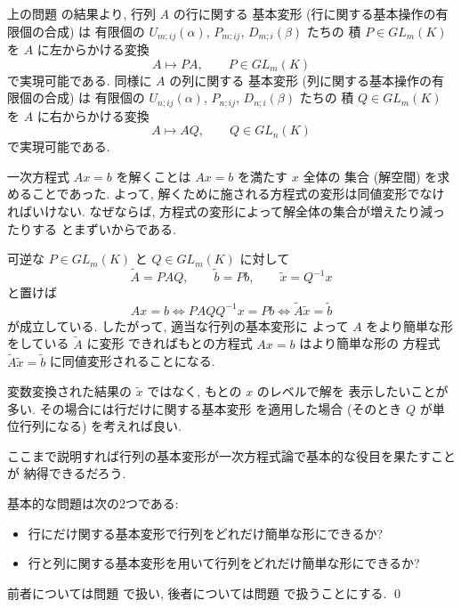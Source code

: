 \documentclass[12pt,twoside]{jarticle}
\begin{document}
\begin{rem}
  \label{rem:elem-tr}
  上の問題  の結果より, 行列 $A$ の行に関する
  基本変形 (行に関する基本操作の有限個の合成) は
  有限個の $U_{m;ij}(\alpha)$, $P_{m;ij}$, $D_{m;i}(\beta)$ たちの
  積 $P\in GL_m(K)$ を $A$ に左からかける変換
  \begin{equation*}
    A \mapsto PA,  \qquad P\in GL_m(K)
  \end{equation*}
  で実現可能である.  同様に $A$ の列に関する
  基本変形 (列に関する基本操作の有限個の合成) は
  有限個の $U_{n;ij}(\alpha)$, $P_{n;ij}$, $D_{n;i}(\beta)$ たちの
  積 $Q\in GL_m(K)$ を $A$ に右からかける変換
  \begin{equation*}
    A \mapsto AQ,  \qquad Q\in GL_n(K)
  \end{equation*}
  で実現可能である. 

  一次方程式 $Ax=b$ を解くことは $Ax=b$ を満たす $x$ 全体の
  集合 (解空間) を求めることであった.
  よって, 解くために施される方程式の変形は同値変形でなければいけない.
  なぜならば, 方程式の変形によって解全体の集合が増えたり減ったりする
  とまずいからである.

  可逆な $P\in GL_m(K)$ と $Q\in GL_m(K)$ に対して
  \begin{equation*}
    \tilde{A}=PAQ, \qquad \tilde{b}=Pb, \qquad \tilde{x}=Q^{-1}x
  \end{equation*}
  と置けば
  \begin{equation*}
    Ax = b \iff  PAQQ^{-1}x = Pb \iff \tilde{A}\tilde{x}=\tilde{b}
  \end{equation*}
  が成立している. したがって, 適当な行列の基本変形に
  よって $A$ をより簡単な形をしている $\tilde{A}$ に変形
  できればもとの方程式 $Ax=b$ はより簡単な形の
  方程式 $\tilde{A}\tilde{x}=\tilde{b}$ に同値変形されることになる.

  変数変換された結果の $\tilde{x}$ ではなく, もとの $x$ のレベルで解を
  表示したいことが多い. その場合には行だけに関する基本変形
  を適用した場合 (そのとき  $Q$ が単位行列になる) を考えれば良い.

  ここまで説明すれば行列の基本変形が一次方程式論で基本的な役目を果たすことが
  納得できるだろう.

  基本的な問題は次の2つである:
  \begin{itemize}
  \item 行にだけ関する基本変形で行列をどれだけ簡単な形にできるか?
  \item 行と列に関する基本変形を用いて行列をどれだけ簡単な形にできるか?
  \end{itemize}
  前者については問題  で扱い, 
  後者については問題  で扱うことにする.
  \qed
\end{rem}
\end{document}
